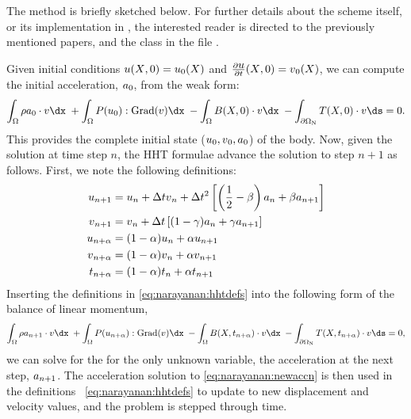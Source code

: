 The method is briefly sketched below. For further details about the scheme
itself, or its implementation in \twist, the interested reader is directed
to the previously mentioned papers, and the 
class in the file .

Given initial conditions $\mbox{$ u$}(\mbox{$ X$}, 0) = \mbox{$ u$}_{0}(\mbox{$ X$})$ and
$\frac{\partial\mbox{$ u$}}{\partial t}(\mbox{$ X$}, 0) = \mbox{$ v$}_{0}(\mbox{$ X$})$, we can
compute the initial acceleration, $\mbox{$ a$}_{0}$, from the weak form:
\begin{equation}
  \int_{\Omega} \rho a_{0} \cdot \bv \dx\; +  \int_{\Omega}
  \bP(u_{0}):\mathrm{Grad}(\bv) \dx\; - \int_{\Omega} \bB(X, 0)
  \cdot \bv \dx\; -  \int_{\partial\Omega_{\mathrm{N}}}
  \bT(X, 0) \cdot \bv \ds = 0.
\end{equation}
This provides the complete initial state ($\mbox{$ u$}_{0}, \mbox{$ v$}_{0}, \mbox{$ a$}_{0}$)
of the body. Now, given the solution at time step $n$, the HHT formulae
advance the solution to step $n+1$ as follows. First, we note the
following definitions:
\begin{equation}
  \begin{split}
    \mbox{$ u$}_{n+1} & = \mbox{$ u$}_{n} + \Delta t \mbox{$ v$}_{n} + \Delta t^{2} \left[
      \left(\frac{1}{2} - \beta \right) \mbox{$ a$}_{n} + \beta \mbox{$ a$}_{n+1}
    \right]\\
    \mbox{$ v$}_{n+1} & = \mbox{$ v$}_{n} + \Delta t \left[ (1-\gamma) \mbox{$ a$}_{n} +
      \gamma \mbox{$ a$}_{n+1} \right]\\
    \mbox{$ u$}_{n+\alpha} & = (1 - \alpha) \mbox{$ u$}_{n} + \alpha \mbox{$ u$}_{n+1}\\
    \mbox{$ v$}_{n+\alpha} & = (1 - \alpha) \mbox{$ v$}_{n} + \alpha \mbox{$ v$}_{n+1}\\
    t_{n+\alpha} &= (1 - \alpha) t_{n} + \alpha t_{n + 1}
\end{split}
\label{eq:narayanan:hhtdefs}
\end{equation}
Inserting the definitions in \eqref{eq:narayanan:hhtdefs}
into the following form of the balance of linear momentum,
\begin{equation}
   \int_{\Omega} \rho a_{n+1} \cdot \bv \dx\; + \int_{\Omega} \bP(u_{n
     + \alpha}):\mathrm{Grad}(\bv) \dx\; - \int_{\Omega} \bB(X, t_{n +
     \alpha}) \cdot \bv \dx\; - \int_{\partial\Omega_{\mathrm{N}}}
   \bT(X, t_{n + \alpha}) \cdot \bv \ds = 0,
\label{eq:narayanan:newaccn}
\end{equation}
we can solve for the for the only unknown variable, the acceleration
at the next step, $\mbox{$ a$}_{n+1}$. The acceleration solution to
\eqref{eq:narayanan:newaccn} is then used in the definitions%
~\eqref{eq:narayanan:hhtdefs} to update to new displacement and
velocity values, and the problem is stepped through time.

